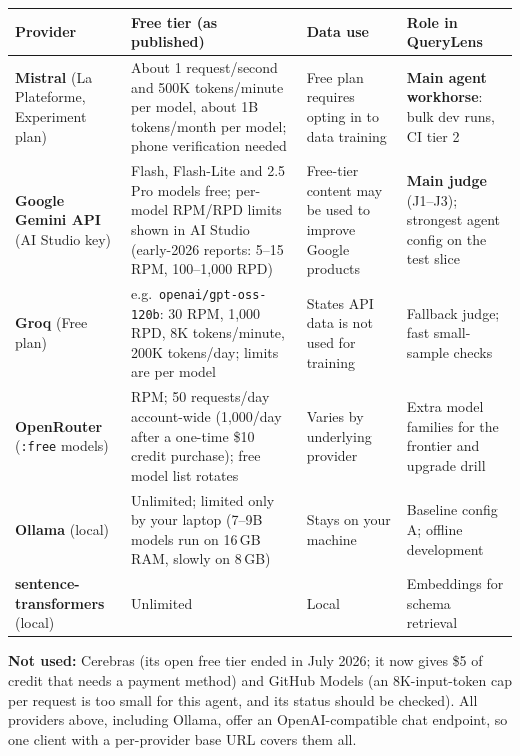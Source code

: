 \documentclass[11pt,a4paper]{article}
\newcommand{\code}[1]{\texttt{\small #1}}
\begin{document}
\begin{center}
\small
\begin{tabularx}{\linewidth}{@{}>{\raggedright\arraybackslash}p{2.2cm} >{\raggedright\arraybackslash}X >{\raggedright\arraybackslash}p{3.2cm} >{\raggedright\arraybackslash}p{3.0cm}@{}}
\toprule
\textbf{Provider} & \textbf{Free tier (as published)} & \textbf{Data use} & \textbf{Role in QueryLens}\\
\midrule
\textbf{Mistral} (La Plateforme, Experiment plan) & About 1 request/second and 500K tokens/minute per model, about 1B tokens/month per model; phone verification needed & Free plan requires opting in to data training & \textbf{Main agent workhorse}: bulk dev runs, CI tier 2\\
\textbf{Google Gemini API} (AI Studio key) & Flash, Flash-Lite and 2.5 Pro models free; per-model RPM/RPD limits shown in AI Studio (early-2026 reports: 5--15 RPM, 100--1{,}000 RPD) & Free-tier content may be used to improve Google products & \textbf{Main judge} (J1--J3); strongest agent config on the test slice\\
\textbf{Groq} (Free plan) & e.g.\ \code{openai/gpt-oss-120b}: 30 RPM, 1{,}000 RPD, 8K tokens/minute, 200K tokens/day; limits are per model & States API data is not used for training & Fallback judge; fast small-sample checks\\
\textbf{OpenRouter} (\code{:free} models) & 20 RPM; 50 requests/day account-wide (1{,}000/day after a one-time \$10 credit purchase); free model list rotates & Varies by underlying provider & Extra model families for the frontier and upgrade drill\\
\textbf{Ollama} (local) & Unlimited; limited only by your laptop (7--9B models run on 16\,GB RAM, slowly on 8\,GB) & Stays on your machine & Baseline config A; offline development\\
\textbf{sentence-transformers} (local) & Unlimited & Local & Embeddings for schema retrieval\\
\bottomrule
\end{tabularx}
\end{center}

\textbf{Not used:} Cerebras (its open free tier ended in July 2026; it now gives \$5 of credit that
needs a payment method) and GitHub Models (an 8K-input-token cap per request is too small for this
agent, and its status should be checked). All providers above, including Ollama, offer an
OpenAI-compatible chat endpoint, so one client with a per-provider base URL covers them all.
\end{document}
